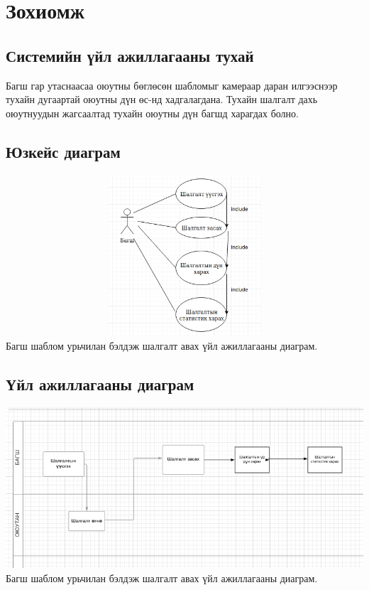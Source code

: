 
\section{Зохиомж} 
	
	\subsection{Системийн үйл ажиллагааны тухай}
	\begin{flushleft}
	Багш гар утаснаасаа оюутны бөглөсөн шабломыг камераар даран илгээснээр тухайн дугаартай оюутны дүн өс-нд хадгалагдана. Тухайн шалгалт дахь оюутнуудын жагсаалтад тухайн оюутны дүн багшд харагдах болно.
	\end{flushleft}
	\subsection{Юзкейс диаграм}
	\begin{flushleft}
	\includegraphics[width=15cm,height=6cm, scale=0.5]{Figures/cusecase.png}
	\hspace*{0pt}\hfill Багш шаблом урьчилан бэлдэж шалгалт авах үйл ажиллагааны диаграм.
	\newline
	\newline
	\end{flushleft}
	
	\subsection{Үйл ажиллагааны диаграм}
	\begin{flushleft}
	\includegraphics[width=15cm,height=6cm, scale=0.5]{Figures/cactivity.png}
	\hspace*{0pt}\hfill Багш шаблом урьчилан бэлдэж шалгалт авах үйл ажиллагааны диаграм.
	\newline
	\newline
	\end{flushleft}
	
